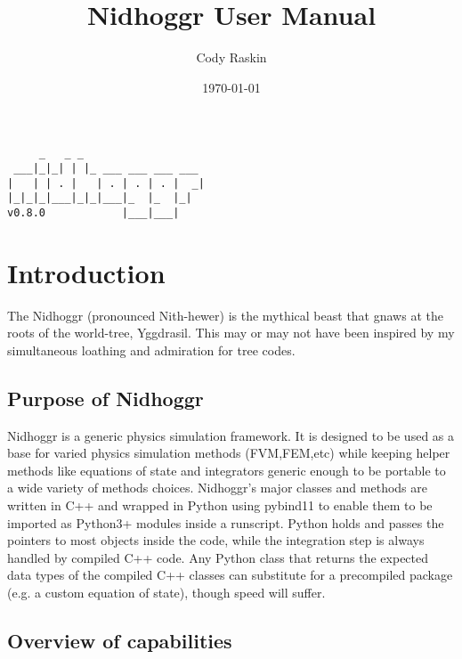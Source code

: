 \documentclass[12pt]{article}
\title{Nidhoggr User Manual}
\author{Cody Raskin}
\date{\today}
\begin{document}
	
	\maketitle
	
	\newpage
	
	\begin{center}
		\begin{verbatim}
     _   _ _
 ___|_|_| | |_ ___ ___ ___ ___
|   | | . |   | . | . | . |  _|
|_|_|_|___|_|_|___|_  |_  |_|
v0.8.0            |___|___|
		\end{verbatim}
	\end{center}
	
	\newpage
	
	\tableofcontents
	\newpage
	
	\section{Introduction}
	
The Nidhoggr (pronounced Nith-hewer) is the mythical beast that gnaws at the roots of the world-tree, Yggdrasil. This may or may not have been inspired by my simultaneous loathing and admiration for tree codes.

	\subsection{Purpose of Nidhoggr}

Nidhoggr is a generic physics simulation framework. It is designed to be used as a base for varied physics simulation methods (FVM,FEM,etc) while keeping helper methods like equations of state and integrators generic enough to be portable to a wide variety of methods choices. Nidhoggr's major classes and methods are written in C++ and wrapped in Python using pybind11 to enable them to be imported as Python3+ modules inside a runscript. Python holds and passes the pointers to most objects inside the code, while the integration step is always handled by compiled C++ code. Any Python class that returns the expected data types of the compiled C++ classes can substitute for a precompiled package (e.g. a custom equation of state), though speed will suffer. 

	\subsection{Overview of capabilities}
	
\end{document}
